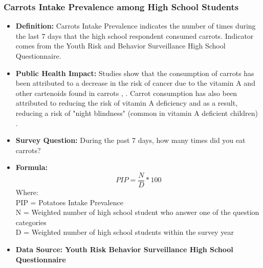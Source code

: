 \documentclass[12pt,letterpaper]{report}
\begin{document}
		\subsubsection{Carrots Intake Prevalence among High School Students} 
	\begin{itemize}
		\item \textbf{Definition:} Carrots Intake Prevalence indicates the number of times during the last 7 days that the high school respondent consumed carrots.  Indicator comes from the Youth Risk and Behavior Surveillance High School Questionnaire.
		\item \textbf{Public Health Impact:}  Studies show that the consumption of carrots has been attributed to a decrease in the risk of cancer due to the vitamin A and other cartenoids found in carrots \cite{engle1991nutritional}, \cite{pool1997consumption}. Carrot consumption has also been attributed to reducing the risk of vitamin A deficiency and as a result, reducing a risk of "night blindness" (common in vitamin A deficient children)  \cite{tang2005spinach}. 
		\item \textbf{Survey Question:} During the past 7 days, how many times did you eat carrots?

		\item \textbf{Formula:} 
			\begin{equation}
			PIP = \frac{N}{D} *100
			\end{equation}
Where: \\
			PIP = Potatoes Intake Prevalence\\
			
			N = Weighted number of high school student who answer one of the question categories\\
			
			D = Weighted number of high school students within the survey year \\
			
		\item \textbf{Data Source: Youth Risk Behavior Surveillance High School Questionnaire}
	\end{itemize}
	

\end{document}

